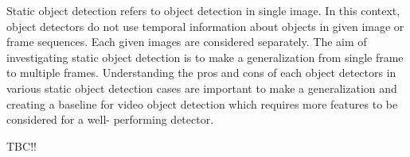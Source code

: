 \documentclass{article}
\begin{document}
\setlength{\parindent}{6ex}

\indent

Static object detection refers to object detection in single image.
In this context, object detectors do not use temporal information about
objects in given image or frame sequences. Each given images are considered
separately. The aim of investigating static object detection is to make a 
generalization from single frame to multiple frames. Understanding the pros 
and cons of each object detectors in various static object detection cases 
are important to make a generalization and creating a baseline for video 
object detection which requires more features to be considered for a well-
performing detector. \par

\vspace{3mm}

TBC!!
\end{document}
